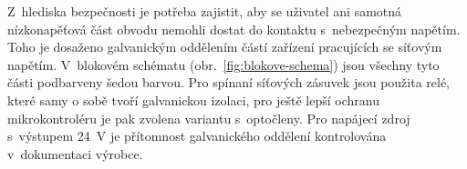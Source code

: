     Z~hlediska bezpečnosti je potřeba zajistit, aby se uživatel ani samotná nízkonapěťová část obvodu nemohli dostat do kontaktu s~nebezpečným napětím. Toho je dosaženo galvanickým oddělením částí zařízení pracujících se síťovým napětím. V~blokovém schématu (obr.~\ref{fig:blokove-schema}) jsou všechny tyto části podbarveny šedou barvou. Pro spínaní síťových zásuvek jsou použita relé, které samy o sobě tvoří galvanickou izolaci, pro ještě lepší ochranu mikrokontroléru je pak zvolena variantu s~optočleny. Pro napájecí zdroj s~výstupem \qty{24}{V} je přítomnost galvanického oddělení kontrolována v~dokumentaci výrobce. 
    


    
    

